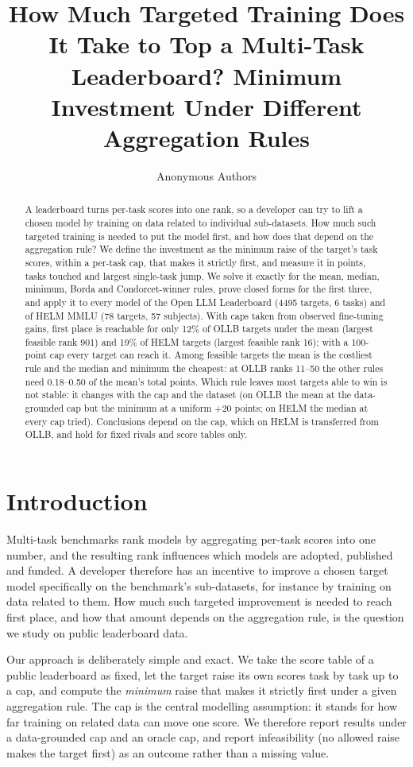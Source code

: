 \documentclass{article}
\title{How Much Targeted Training Does It Take to Top a Multi-Task Leaderboard? Minimum Investment Under Different Aggregation Rules}
\author{Anonymous Authors}
\begin{document}
\maketitle

\begin{abstract}
A leaderboard turns per-task scores into one rank, so a developer can try to lift a chosen model by training on data related to individual sub-datasets. How much such targeted training is needed to put the model first, and how does that depend on the aggregation rule? We define the investment as the minimum raise of the target's task scores, within a per-task cap, that makes it strictly first, and measure it in points, tasks touched and largest single-task jump. We solve it exactly for the mean, median, minimum, Borda and Condorcet-winner rules, prove closed forms for the first three, and apply it to every model of the Open LLM Leaderboard (4495 targets, 6 tasks) and of HELM MMLU (78 targets, 57 subjects). With caps taken from observed fine-tuning gains, first place is reachable for only 12\% of OLLB targets under the mean (largest feasible rank 901) and 19\% of HELM targets (largest feasible rank 16); with a 100-point cap every target can reach it. Among feasible targets the mean is the costliest rule and the median and minimum the cheapest: at OLLB ranks 11--50 the other rules need 0.18--0.50 of the mean's total points. Which rule leaves most targets able to win is not stable: it changes with the cap and the dataset (on OLLB the mean at the data-grounded cap but the minimum at a uniform $+20$ points; on HELM the median at every cap tried). Conclusions depend on the cap, which on HELM is transferred from OLLB, and hold for fixed rivals and score tables only.
\end{abstract}

\section{Introduction}
\label{sec:intro}
Multi-task benchmarks rank models by aggregating per-task scores into one number, and the resulting rank influences which models are adopted, published and funded. A developer therefore has an incentive to improve a chosen target model specifically on the benchmark's sub-datasets, for instance by training on data related to them. How much such targeted improvement is needed to reach first place, and how that amount depends on the aggregation rule, is the question we study on public leaderboard data.

Our approach is deliberately simple and exact. We take the score table of a public leaderboard as fixed, let the target raise its own scores task by task up to a cap, and compute the \emph{minimum} raise that makes it strictly first under a given aggregation rule. The cap is the central modelling assumption: it stands for how far training on related data can move one score. We therefore report results under a data-grounded cap and an oracle cap, and report infeasibility (no allowed raise makes the target first) as an outcome rather than a missing value.
\end{document}

